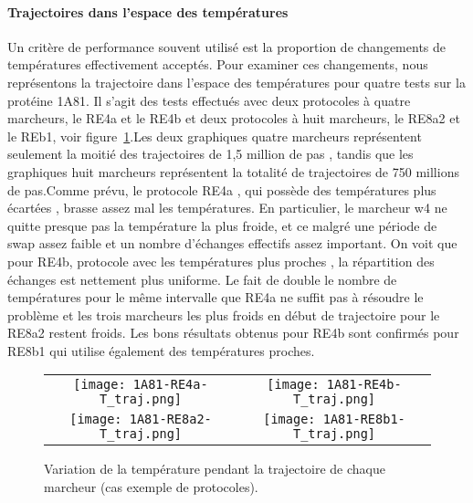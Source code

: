 \paragraph{Trajectoires dans l'espace des températures}

Un critère de performance souvent utilisé est la proportion de changements de températures effectivement acceptés. Pour examiner ces changements, nous représentons la trajectoire dans l'espace des températures pour quatre tests sur la protéine 1A81. Il s'agit des tests effectués avec deux protocoles à quatre marcheurs, le RE4a et le RE4b et deux protocoles à huit marcheurs, le RE8a2 et le REb1, voir figure~\ref{graph:TRAJ_T}.Les deux graphiques quatre marcheurs représentent seulement la moitié des trajectoires de 1,5 million de pas , tandis que les graphiques huit marcheurs représentent la totalité de trajectoires de 750 millions de pas.Comme prévu, le protocole RE4a , qui possède des températures plus écartées , brasse assez mal les températures. En particulier, le marcheur w4 ne quitte presque pas la température la plus froide, et ce malgré une période de swap assez faible et un nombre d'échanges effectifs assez important. On voit que pour RE4b, protocole avec les températures plus proches , la répartition des échanges est nettement plus uniforme. Le fait de double le nombre de températures pour le même intervalle que RE4a ne suffit pas à résoudre le problème et les trois marcheurs les plus froids en début de trajectoire pour le RE8a2 restent froids. Les bons résultats obtenus pour RE4b sont confirmés pour RE8b1 qui utilise également des températures proches.     


   \begin{figure}[t]
     \centering
     \begin{tabular}{cc}
       \texttt{[image: 1A81-RE4a-T\_traj.png]} &
       \texttt{[image: 1A81-RE4b-T\_traj.png]} \\
       \texttt{[image: 1A81-RE8a2-T\_traj.png]} &
       \texttt{[image: 1A81-RE8b1-T\_traj.png]} \\
     \end{tabular}
     \caption{Variation de la température pendant la trajectoire de chaque marcheur (cas exemple de protocoles).}
\label{graph:TRAJ_T}
   \end{figure}


    \clearpage
